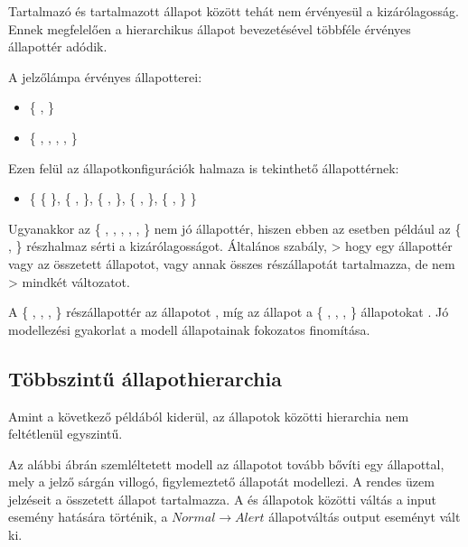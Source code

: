 Tartalmazó és tartalmazott állapot között tehát nem érvényesül a kizárólagosság. Ennek megfelelően a hierarchikus állapot bevezetésével többféle érvényes állapottér adódik.

\begin{megjegyzes}
A jelzőlámpa érvényes állapotterei:

\begin{itemize}
	\item  \{ ,  \}
	\item  \{ , , , ,  \}
\end{itemize}

Ezen felül az állapotkonfigurációk halmaza is tekinthető állapottérnek:

\begin{itemize}
	\item \{ \{  \}, \{ ,  \}, \{ ,  \}, \{ ,  \}, \{ ,  \} \}
\end{itemize}

Ugyanakkor az \{ , , , , ,  \} nem jó állapottér, hiszen ebben az esetben például az \{ ,  \} részhalmaz sérti a kizárólagosságot. Általános szabály, > hogy egy állapottér vagy az összetett állapotot, vagy annak összes részállapotát tartalmazza, de nem > mindkét változatot.
\end{megjegyzes}

A \{ , , ,  \} részállapottér az  állapotot , míg az  állapot a \{ , , ,  \} állapotokat . Jó modellezési gyakorlat a modell állapotainak fokozatos finomítása.

\subsection{Többszintű állapothierarchia}

Amint a következő példából kiderül, az állapotok közötti hierarchia nem feltétlenül egyszintű.

\begin{megjegyzes}
Az alábbi ábrán szemléltetett modell az  állapotot tovább bővíti egy  állapottal, mely a jelző sárgán villogó, figylemeztető állapotát modellezi. A rendes üzem jelzéseit a  összetett állapot tartalmazza. A  és  állapotok közötti váltás a  input esemény hatására történik, a $\mathit{Normal} \rightarrow \mathit{Alert}$ állapotváltás  output eseményt vált ki.

\end{megjegyzes}


